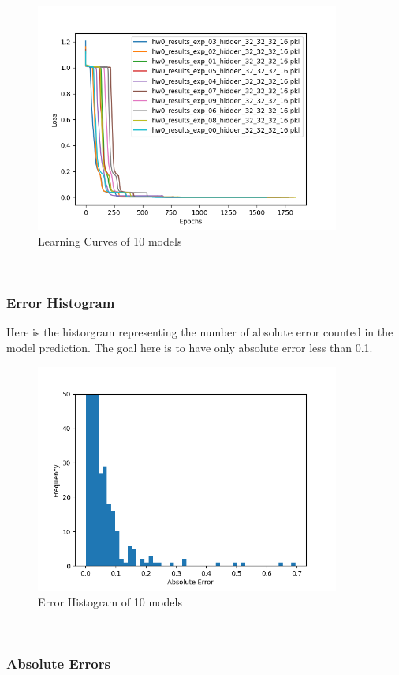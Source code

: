\documentclass[11pt]{article}
\begin{document}
\begin{figure}[htbp]
\centering
\includegraphics[width=10cm]{img/learning_curves.png}
\caption{Learning Curves of 10 models}
\end{figure}\\[0pt]

\subsubsection{Error Histogram}
\label{sec:org01a1550}

Here is the historgram representing the number of absolute error counted in the model prediction. The goal here is to have only absolute error less than 0.1.\\[0pt]

\begin{figure}[htbp]
\centering
\includegraphics[width=10cm]{img/error_histogram.png}
\caption{Error Histogram of 10 models}
\end{figure}\\[0pt]

\subsubsection{Absolute Errors}
\label{sec:org87025f4}
\end{document}
